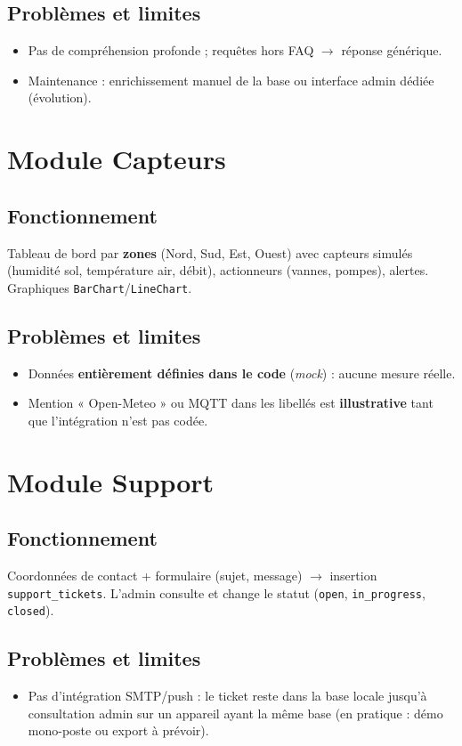 \documentclass[12pt,a4paper,twoside,openright]{report}
\begin{document}
\subsection{Problèmes et limites}
\begin{itemize}
  \item Pas de compréhension profonde ; requêtes hors FAQ $\rightarrow$ réponse générique.
  \item Maintenance : enrichissement manuel de la base ou interface admin dédiée (évolution).
\end{itemize}

\section{Module Capteurs}

\subsection{Fonctionnement}
Tableau de bord par \textbf{zones} (Nord, Sud, Est, Ouest) avec capteurs simulés (humidité sol, température air, débit), actionneurs (vannes, pompes), alertes. Graphiques \texttt{BarChart}/\texttt{LineChart}.

\subsection{Problèmes et limites}
\begin{itemize}
  \item Données \textbf{entièrement définies dans le code} (\textit{mock}) : aucune mesure réelle.
  \item Mention « Open-Meteo » ou MQTT dans les libellés est \textbf{illustrative} tant que l'intégration n'est pas codée.
\end{itemize}

\section{Module Support}

\subsection{Fonctionnement}
Coordonnées de contact + formulaire (sujet, message) $\rightarrow$ insertion \texttt{support\_tickets}. L'admin consulte et change le statut (\texttt{open}, \texttt{in\_progress}, \texttt{closed}).

\subsection{Problèmes et limites}
\begin{itemize}
  \item Pas d'intégration SMTP/push : le ticket reste dans la base locale jusqu'à consultation admin sur un appareil ayant la même base (en pratique : démo mono-poste ou export à prévoir).
\end{itemize}
\end{document}
